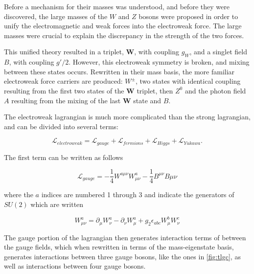 Before a mechanism for their masses was understood, and before they were discovered, the large masses of the $W$ and $Z$ bosons were proposed in order to unify the electromagnetic and weak forces into the electroweak force. The large masses were crucial to explain the discrepancy in the strength of the two forces. 

This unified theory resulted in a triplet, $\bm{W}$, with coupling $g_W$, and a singlet field $B$, with coupling $g'/2$. However, this electroweak symmetry is broken, and mixing between these states occurs. Rewritten in their mass basis, the more familiar electroweak force carriers are produced: $W^\pm$, two states with identical coupling resulting from the first two states of the $\bm{W}$ triplet, then $Z^0$ and the photon field $A$ resulting from the mixing of the last $\bm{W}$ state and $B$. 

The electroweak lagrangian is much more complicated than the strong lagrangian, and can be divided into several terms:

\begin{equation}
\mathcal{L}_{electroweak} = \mathcal{L}_{gauge} + \mathcal{L}_{fermions} + \mathcal{L}_{Higgs} + \mathcal{L}_{Yukawa} .
\end{equation}

The first term can be written as follows

\begin{equation}
\mathcal{L}_{gauge} = -\frac{1}{4}W^{a\mu\nu}W^a_{\mu\nu} - \frac{1}{4}B^{\mu\nu}B{\mu\nu} 
\end{equation}

where the $a$ indices are numbered 1 through 3 and indicate the generators of $SU(2)$ which are written 

\begin{equation}
W^a_{\mu\nu} = \partial_\mu W^a_\nu - \partial_\nu W^a_\mu + g_2 \epsilon_{abc} W^b_\mu W^c_\nu
\end{equation}

The gauge portion of the lagrangian then generates interaction terms of between the gauge fields, which when rewritten in terms of the mass-eigenstate basis, generates interactions between three gauge bosons, like the ones in \autoref{fig:tlgc}, as well as interactions between four gauge bosons.

